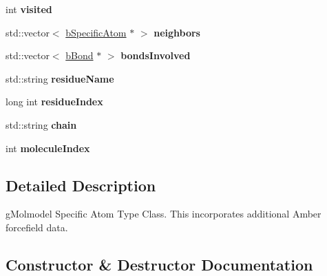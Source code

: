 \begin{DoxyCompactItemize}
\item 
int {\bfseries visited}\hypertarget{classbSpecificAtom_a11eb1fbcf1a3b5b6139e62c56d2bd789}{}\label{classbSpecificAtom_a11eb1fbcf1a3b5b6139e62c56d2bd789}

\item 
std\+::vector$<$ \hyperlink{classbSpecificAtom}{b\+Specific\+Atom} $\ast$ $>$ {\bfseries neighbors}\hypertarget{classbSpecificAtom_a65d4cd374c59db6a0ce5b7f960e2f3ae}{}\label{classbSpecificAtom_a65d4cd374c59db6a0ce5b7f960e2f3ae}

\item 
std\+::vector$<$ \hyperlink{classbBond}{b\+Bond} $\ast$ $>$ {\bfseries bonds\+Involved}\hypertarget{classbSpecificAtom_a498e5121bb734d0cb58f44cf090477be}{}\label{classbSpecificAtom_a498e5121bb734d0cb58f44cf090477be}

\item 
std\+::string {\bfseries residue\+Name}\hypertarget{classbSpecificAtom_aedc6f9e14b15fc7c8cdff14caddd8838}{}\label{classbSpecificAtom_aedc6f9e14b15fc7c8cdff14caddd8838}

\item 
long int {\bfseries residue\+Index}\hypertarget{classbSpecificAtom_a79706ad27a39d70867a6c2a98e8cbca1}{}\label{classbSpecificAtom_a79706ad27a39d70867a6c2a98e8cbca1}

\item 
std\+::string {\bfseries chain}\hypertarget{classbSpecificAtom_a1dd988b820bb24af17fa3874e86d679b}{}\label{classbSpecificAtom_a1dd988b820bb24af17fa3874e86d679b}

\item 
int {\bfseries molecule\+Index}\hypertarget{classbSpecificAtom_ab9912fd92593f0b82d1ddb665767047a}{}\label{classbSpecificAtom_ab9912fd92593f0b82d1ddb665767047a}

\end{DoxyCompactItemize}


\subsection{Detailed Description}
g\+Molmodel Specific Atom Type Class. This incorporates additional Amber forcefield data. 

\subsection{Constructor \& Destructor Documentation}
